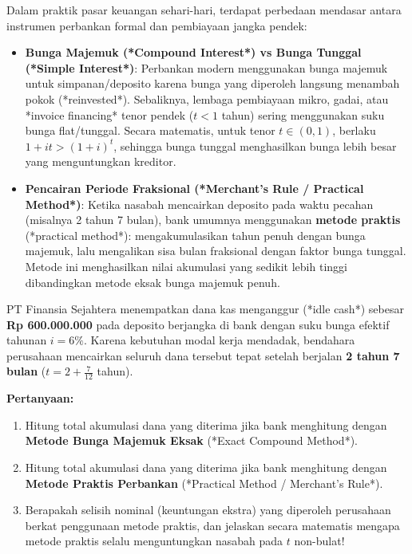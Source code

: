 \documentclass[11pt,a4paper]{article}
\begin{document}
\begin{kasusbox}
Dalam praktik pasar keuangan sehari-hari, terdapat perbedaan mendasar antara instrumen perbankan formal dan pembiayaan jangka pendek:
\begin{itemize}[leftmargin=4mm, topsep=1pt, itemsep=1pt]
    \item \textbf{Bunga Majemuk (*Compound Interest*) vs Bunga Tunggal (*Simple Interest*)}: Perbankan modern menggunakan bunga majemuk untuk simpanan/deposito karena bunga yang diperoleh langsung menambah pokok (*reinvested*). Sebaliknya, lembaga pembiayaan mikro, gadai, atau *invoice financing* tenor pendek ($t < 1$ tahun) sering menggunakan suku bunga flat/tunggal. Secara matematis, untuk tenor $t \in (0,1)$, berlaku $1 + it > (1+i)^t$, sehingga bunga tunggal menghasilkan bunga lebih besar yang menguntungkan kreditor.
    \item \textbf{Pencairan Periode Fraksional (*Merchant's Rule / Practical Method*)}: Ketika nasabah mencairkan deposito pada waktu pecahan (misalnya 2 tahun 7 bulan), bank umumnya menggunakan \textbf{metode praktis} (*practical method*): mengakumulasikan tahun penuh dengan bunga majemuk, lalu mengalikan sisa bulan fraksional dengan faktor bunga tunggal. Metode ini menghasilkan nilai akumulasi yang sedikit lebih tinggi dibandingkan metode eksak bunga majemuk penuh.
\end{itemize}
\end{kasusbox}

\begin{soalbox}
PT Finansia Sejahtera menempatkan dana kas menganggur (*idle cash*) sebesar \textbf{Rp 600.000.000} pada deposito berjangka di bank dengan suku bunga efektif tahunan $i = 6\%$. Karena kebutuhan modal kerja mendadak, bendahara perusahaan mencairkan seluruh dana tersebut tepat setelah berjalan \textbf{2 tahun 7 bulan} ($t = 2 + \frac{7}{12}$ tahun).

\textbf{Pertanyaan:}
\begin{enumerate}[label=(\alph*), topsep=1pt, itemsep=1pt]
    \item Hitung total akumulasi dana yang diterima jika bank menghitung dengan \textbf{Metode Bunga Majemuk Eksak} (*Exact Compound Method*).
    \item Hitung total akumulasi dana yang diterima jika bank menghitung dengan \textbf{Metode Praktis Perbankan} (*Practical Method / Merchant's Rule*).
    \item Berapakah selisih nominal (keuntungan ekstra) yang diperoleh perusahaan berkat penggunaan metode praktis, dan jelaskan secara matematis mengapa metode praktis selalu menguntungkan nasabah pada $t$ non-bulat!
\end{enumerate}
\end{soalbox}
\end{document}
